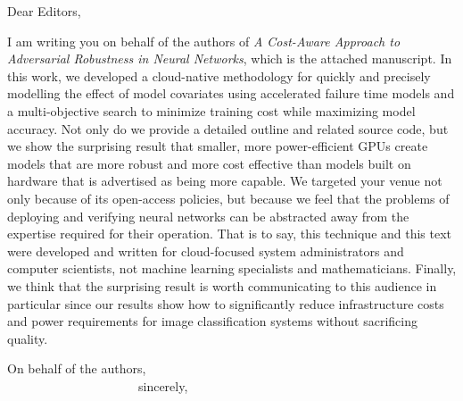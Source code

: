 \documentclass{letter}
\begin{document}
\begin{letter}{}
\opening{Dear Editors,}

I am writing you on behalf of the authors of \textit{A Cost-Aware Approach to Adversarial Robustness in Neural Networks}, which is the attached manuscript.  In this work, we developed a cloud-native methodology for quickly and precisely modelling the effect of model covariates using accelerated failure time models and a multi-objective search to minimize training cost while maximizing model accuracy. Not only do we provide a detailed outline and related source code, but we show the surprising result that smaller, more power-efficient GPUs create models that are more robust and more cost effective than models built on hardware that is advertised as being more capable. We targeted your venue not only because of its open-access policies, but because we feel that the problems of deploying and verifying neural networks can be abstracted away from the expertise required for their operation. That is to say, this technique and this text were developed and written for cloud-focused system administrators and computer scientists, not machine learning specialists and mathematicians. Finally, we think that the surprising result is worth communicating to this audience in particular since our results show how to significantly reduce infrastructure costs and power requirements for image classification systems without sacrificing quality.

\closing{On behalf of the authors, \\~~~~~~~~~~~~~~~~~~~~~sincerely,}
\end{letter}
\end{document}
